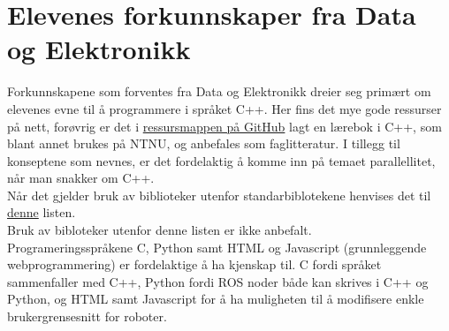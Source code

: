 \section{Elevenes forkunnskaper fra Data og Elektronikk} \label{Sec: KoordDataEl}

    Forkunnskapene som forventes fra Data og Elektronikk dreier seg primært om elevenes evne til å programmere i språket C++.
    Her fins det mye gode ressurser på nett, forøvrig er det i \href{https://github.com/KvalheimRacing/KubenRobotics/tree/master/Resources}{ressursmappen på GitHub} lagt en lærebok i C++, som blant annet brukes på NTNU, og anbefales som faglitteratur. I tillegg til konseptene som nevnes, er det fordelaktig å komme inn på temaet parallellitet, når man snakker om C++.\\
    Når det gjelder bruk av biblioteker utenfor standarbiblotekene henvises det til \href{https://en.cppreference.com/w/cpp/links/libs}{denne} listen.\\
    Bruk av bibloteker utenfor denne listen er ikke anbefalt.\\
    Programeringsspråkene C, Python samt HTML og Javascript (grunnleggende webprogrammering) er fordelaktige å ha kjenskap til. C fordi språket sammenfaller med C++, Python fordi ROS noder både kan skrives i C++ og Python, og HTML samt Javascript for å ha muligheten til å modifisere enkle brukergrensesnitt for roboter.
